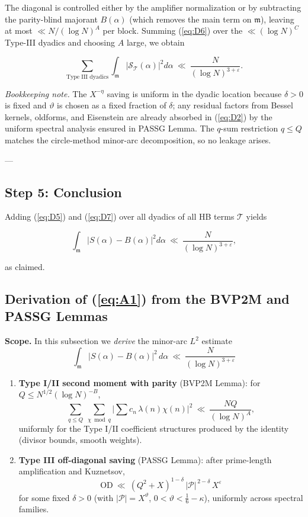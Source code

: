 \documentclass[11pt]{article}
\def\eqref#1{(\ref{#1})}%
\theoremstyle{definition}
\theoremstyle{remark}
\numberwithin{equation}{part}
\begin{document}
The diagonal is controlled either by the amplifier normalization or by subtracting the parity-blind majorant $B(\alpha)$ (which removes the main term on $\mathfrak m$), leaving at most $\ll N/(\log N)^A$ per block. Summing \eqref{eq:D6} over the $\ll(\log N)^C$ Type-III dyadics and choosing $A$ large, we obtain

\begin{equation}\label{eq:D7}\sum_{\text{Type III dyadics}}\int_{\mathfrak m}\big|\mathcal S_{\mathcal T}(\alpha)\big|^2 d\alpha\ \ll\ \frac{N}{(\log N)^{3+\varepsilon}}.\end{equation}

\emph{Bookkeeping note.} The $X^{-\eta}$ saving is uniform in the dyadic location because $\delta>0$ is fixed and $\vartheta$ is chosen as a fixed fraction of $\delta$; any residual factors from Bessel kernels, oldforms, and Eisenstein are already absorbed in \eqref{eq:D2} by the uniform spectral analysis ensured in PASSG Lemma. The $q$-sum restriction $q\le Q$ matches the circle-method minor-arc decomposition, so no leakage arises.

---

\subsection{Step 5: Conclusion}
Adding \eqref{eq:D5} and \eqref{eq:D7} over all dyadics of all HB terms $\mathcal T$ yields

$$
	\int_{\mathfrak m}\big|S(\alpha)-B(\alpha)\big|^2 d\alpha
	\ \ll\ \frac{N}{(\log N)^{3+\varepsilon}},
$$

as claimed.
\subsection{Derivation of \eqref{eq:A1} from the BVP2M and PASSG Lemmas}

\noindent\textbf{Scope.} In this subsection we \emph{derive} the minor-arc $L^2$ estimate
\[\int_{\mathfrak m}|S(\alpha)-B(\alpha)|^2\,d\alpha\ \ll\ \frac{N}{(\log N)^{3+\varepsilon}}\]
\begin{enumerate}[label=(\roman*)]
	\item \textbf{Type I/II second moment with parity} (BVP2M Lemma): for $Q\le N^{1/2}(\log N)^{-B}$,
	      \[
		      \sum_{q\le Q}\ \sum_{\chi\bmod q}\Big|\sum c_n\,\lambda(n)\chi(n)\Big|^2
		      \ \ll\ \frac{NQ}{(\log N)^A},
	      \]
	      uniformly for the Type I/II coefficient structures produced by the identity (divisor bounds, smooth weights).

	\item \textbf{Type III off-diagonal saving} (PASSG Lemma): after prime-length amplification and Kuznetsov,
	      \[
		      \mathrm{OD}\ \ll\ (Q^2+X)^{1-\delta}\,|\mathcal P|^{\,2-\delta}\,X^{\varepsilon}
	      \]
	      for some fixed $\delta>0$ (with $|\mathcal P|=X^\vartheta$, $0<\vartheta<\tfrac16-\kappa$), uniformly across spectral families.
\end{enumerate}
\end{document}
